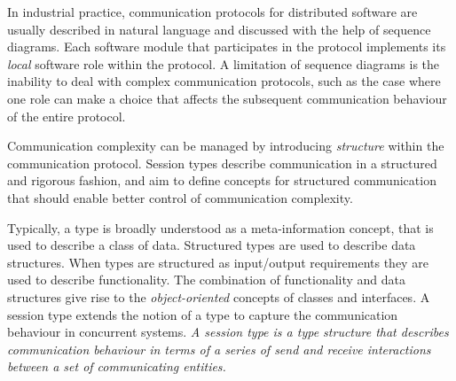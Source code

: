 In industrial practice, communication protocols for
distributed software are usually described in natural language and
discussed with the help of sequence diagrams.
Each software module that participates in the
protocol implements
its \emph{local} software role within the protocol.
A limitation of sequence diagrams is the inability to deal with complex
communication protocols, such as the case where one role
can make a choice that affects the subsequent communication behaviour
of the entire protocol.

Communication complexity can be managed by
introducing \emph{structure} within the communication protocol.
Session types describe communication in a structured and rigorous fashion,
and aim to define concepts for structured communication
that should enable better control of communication complexity.


Typically, a type is broadly understood
as a meta-information concept, that is used to describe a class of data.
Structured types are used to describe data structures.
When types are structured as input/output requirements they
are used to describe functionality.
The combination of functionality and data structures give rise
to the \emph{object-oriented} concepts of classes and interfaces. %
%
A session type extends %
the notion of a type to capture the communication behaviour in concurrent systems.
{\em A session type is a type structure that describes communication
	behaviour in terms of a series of send and receive %
	interactions between a set of communicating entities.}  %

